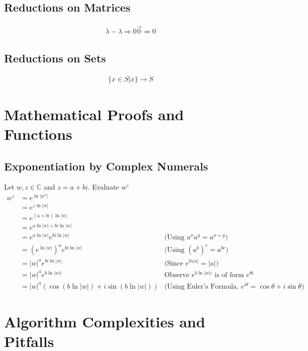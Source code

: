 \documentclass[11pt,a4paper]{book}
\begin{document}
\section{Reductions on Matrices}

\begin{eqnarray}
\lambda - \lambda \Rightarrow 0
\vec{0} \Rightarrow 0
\end{eqnarray}

\section{Reductions on Sets}

\begin{eqnarray}
\lbrace x \in S | x \rbrace \rightarrow S
\end{eqnarray}


\appendix

\chapter{Mathematical Proofs and Functions}
\section{Exponentiation by Complex Numerals}
Let $w, z \in \mathbb{C}$ and $z = a + bi$. Evaluate $w^z$
\begin{align*}
w^z & = e^{\ln|w^z|} & \\
& = e^{z\ln|w|} & \\
& = e^{(a + bi)\ln|w|} & \\
& = e^{a\ln|w| + bi\ln|w|} & \\
& = e^{a\ln|w|}e^{bi\ln|w|} & \text{(Using $a^xa^y = a^{x+y}$)}\\
& = \left(e^{\ln|w|}\right)^a e^{bi\ln|w|}  & \text{(Using $\left(a^{b}\right)^c = a^{bc}$)}\\
& = |w|^ae^{bi\ln|w|} & \text{(Since $e^{ln|a|} = |a|$)} \\
& = |w|^ae^{b\ln|w|i} & \text{Observe $e^{b\ln|w|i}$ is of form $e^{\theta i}$}\\
& = |w|^a\left(\cos\left(b\ln|w|\right) + i \sin\left(b\ln|w|\right) \right) & \text{(Using Euler's Formula, $e^{i\theta} = \cos\theta + i\sin\theta$)}
\end{align*}

\chapter{Algorithm Complexities and Pitfalls}
\end{document}
